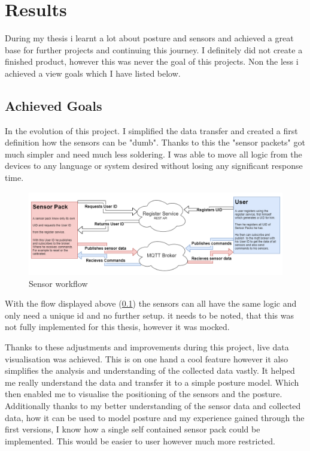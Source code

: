 \chapter*{Results}
\label{chap:Results}
\setcounter{section}{0}

During my thesis i learnt a lot about posture and sensors and achieved a great base for further projects and continuing this journey. I definitely did not create a finished product, however this was never the goal of this projects. Non the less i achieved a view goals which I have listed below.

\section{Achieved Goals}

In the evolution of this project. I simplified the data transfer and created a first definition how the sensors can be "dumb". Thanks to this the "sensor packets" got much simpler and need much less soldering. I was able to move all logic from the devices to any language or system desired without losing any significant response time. 

\begin{figure}[h]
  \begin{center}
\includegraphics[width=\textwidth]{images/DumbSensor.png}
  \end{center}
  \caption{Sensor workflow}
  \label{fig:SensorWorkflow}
\end{figure}

With the flow displayed above (\ref{fig:SensorWorkflow}) the sensors can all have the same logic and only need  a unique id and no further setup. it needs to be noted, that this was not fully implemented for this thesis, however it was mocked. 

Thanks to these adjustments and improvements during this project, live data visualisation was achieved. This is on one hand a cool feature however it also simplifies the analysis and understanding of the collected data vastly. It helped me really understand the data and transfer it to a simple posture model. Which then enabled me to visualise the positioning of the sensors and the posture. Additionally thanks to my better understanding of the sensor data and collected data, how it can be used to model posture and my experience gained through the first versions, I know how a single self contained sensor pack could be implemented. This would be easier to user however much more restricted. 

